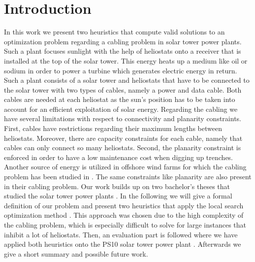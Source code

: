 \section{Introduction}
In this work we present two heuristics that compute valid solutions to an optimization problem regarding a cabling problem in solar tower power plants. Such a plant focuses sunlight with the help of heliostats onto a receiver that is installed at the top of the solar tower. This energy heats up a medium like oil or sodium in order to power a turbine which generates electric energy in return.
Such a plant consists of a solar tower and heliostats that have to be connected to the solar tower with two types of cables, namely a power and data cable. Both cables are needed at each heliostat as the sun's position has to be taken into account for an efficient exploitation of solar energy. Regarding the cabling we have several limitations with respect to connectivity and planarity constraints. First, cables have restrictions regarding their maximum lengths between heliostats. Moreover, there are capacity constraints for each cable, namely that cables can only connect so many heliostats. Second, the planarity constraint is enforced in order to have a low maintenance cost when digging up trenches.
\emptyline
\noindent
Another source of energy is utilized in offshore wind farms for which the cabling problem has been studied in \cite{gonzales_2012,bauer_2015,fischetti_2018}. The same constraints like planarity are also present in their cabling problem. Our work builds up on two bachelor's theses that studied the solar tower power plants \cite{franziska_2017,tanja_2018}.
\emptyline
\noindent
In the following we will give a formal definition of our problem and present two heuristics that apply the local search optimization method \cite{aarts_2003,voss_2012}. This approach was chosen due to the high complexity of the cabling problem, which is especially difficult to solve for large instances that inhibit a lot of heliostats. Then, an evaluation part is followed where we have applied both heuristics onto the PS10 solar tower power plant \cite{osuna_2001,osuna_2006}. Afterwards we give a short summary and possible future work.


